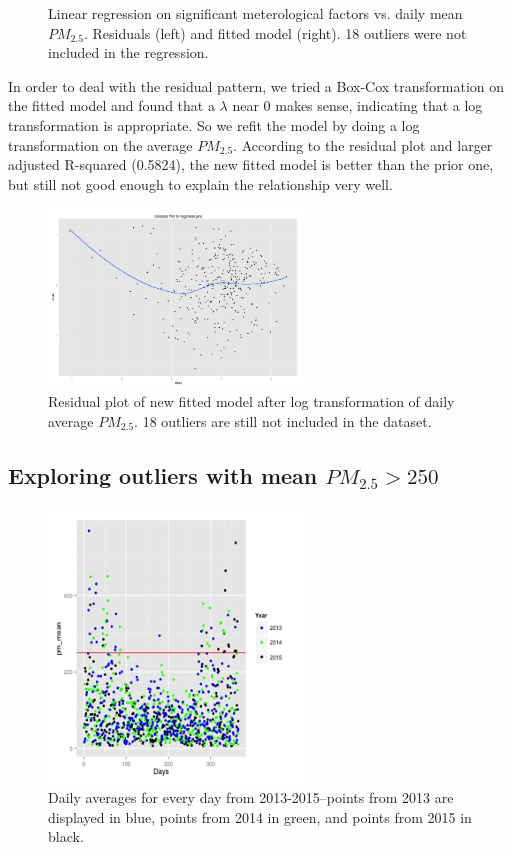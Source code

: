\documentclass[11pt]{article} %
\begin{document}
\begin{figure}
\begin{minipage}{.5\textwidth}
  \label{fig:test2}
\end{minipage}
\caption{Linear regression on significant meterological factors vs. daily mean \(PM_{2.5}\). Residuals (left) and fitted model (right). 18 outliers were not included in the regression.}
\end{figure}

In order to deal with the residual pattern, we tried a Box-Cox transformation on the fitted model and found that a \(\lambda\) near 0 makes sense, indicating that a log transformation is appropriate. So we refit the model by doing a log transformation on the average \(PM_{2.5}\). According to the residual plot and larger adjusted R-squared (0.5824), the new fitted model is better than the prior one, but still not good enough to explain the relationship very well.

 \begin{figure}[!ht]
  \centering
    \includegraphics[width=0.6\textwidth]{Figure2-4}
      \caption{Residual plot of new fitted model after log transformation of daily average \(PM_{2.5}\). 18 outliers are still not included in the dataset.}
\end{figure}

\subsection{Exploring outliers with mean \(PM_{2.5} > 250\)}

 \begin{figure}[!ht]
  \centering
    \includegraphics[width=0.6\textwidth]{Figure2-5}
      \caption{Daily averages for every day from 2013-2015--points from 2013 are displayed in blue, points from 2014 in green, and points from 2015 in black.}
\end{figure}
\end{document}
